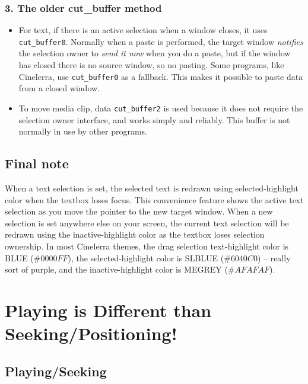 \subsubsection*{3. The older cut\_buffer method}%
\label{ssub:older_cut_buffer_method}

\begin{itemize}
    \item For text, if there is an active selection when a window closes, it uses \texttt{cut\_buffer0}.  Normally when a paste is performed, the target window \textit{notifies} the selection owner to \textit{send it now} when you do a paste, but if the window has closed there is no source window, so no pasting.  Some programs, like Cinelerra, use \texttt{cut\_buffer0} as a fallback.  This makes it possible to paste data from a closed window.
    \item To move media clip, data \texttt{cut\_buffer2} is used because it does not require the selection owner interface, and works simply and reliably.  This buffer is not normally in use by other programs.
\end{itemize}

\subsection*{Final note}%
\label{sub:final_note}

When a text selection is set, the selected text is redrawn using selected-highlight color when the textbox loses focus.  This convenience feature shows the active text selection as you move the pointer to the new target window.  When a new selection is set anywhere else on your screen, the current text selection will be redrawn using the inactive-highlight color as the textbox loses selection ownership.  In most Cinelerra themes, the drag selection text-highlight color is BLUE ($\#0000FF$), the selected-highlight color is SLBLUE ($\#6040C0$) -- really sort of purple, and the inactive-highlight color is MEGREY ($\#AFAFAF$).

\section{Playing is Different than Seeking/Positioning!}%
\label{sec:playing_seeking_positioning}

\subsection{Playing/Seeking}%
\label{sub:playing_seeking}

